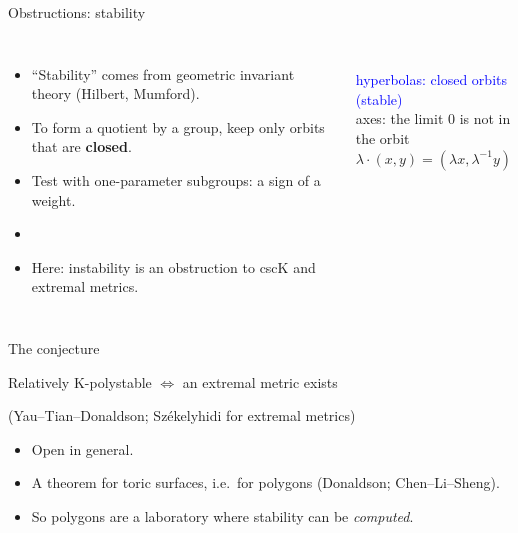 \documentclass[aspectratio=169,11pt]{beamer}
\newcommand{\hl}[1]{\textcolor{accent}{#1}}
\newcommand{\aside}[1]{{\small\color{muted}#1}}
\begin{document}
\begin{frame}{Obstructions: stability}
  \begin{columns}[c]
    \begin{itemize}
      \item ``Stability'' comes from geometric invariant theory \aside{(Hilbert, Mumford)}.
      \item To form a quotient by a group, keep only orbits that are \textbf{closed}.
      \item Test with one-parameter subgroups: a sign of a weight.
      \item[]
      \item Here: \hl{instability is an obstruction} to cscK and extremal metrics.
    \end{itemize}
    \begin{center}
    \\[2pt]
    {\small \textcolor{blue}{hyperbolas: closed orbits (stable)}\\
     \textcolor{accent}{axes: the limit $0$ is not in the orbit}}\\[2pt]
    \aside{$\lambda\cdot(x,y) = (\lambda x, \lambda^{-1}y)$}
    \end{center}
  \end{columns}
\end{frame}

\begin{frame}{The conjecture}
  \begin{center}
  \Large Relatively K-polystable \;$\iff$\; an extremal metric exists
  \end{center}
  \begin{center}\aside{(Yau--Tian--Donaldson; Székelyhidi for extremal metrics)}\end{center}
  \vspace{1em}
  \begin{itemize}
    \item Open in general.
    \item \hl{A theorem for toric surfaces}, i.e.\ for polygons \aside{(Donaldson; Chen--Li--Sheng)}.
    \item[] So polygons are a laboratory where stability can be \emph{computed}.
  \end{itemize}
\end{frame}
\end{document}
